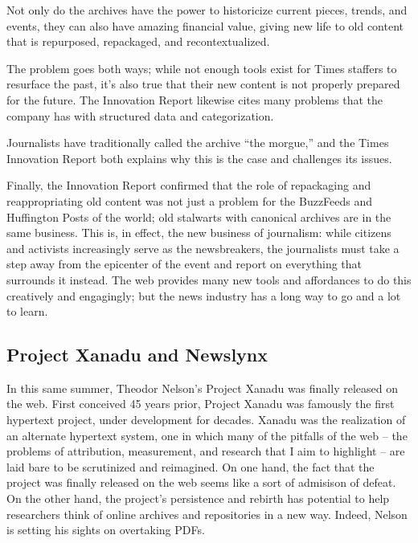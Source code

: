 Not only do the archives have the power to historicize current pieces, trends, and events, they can also have amazing financial value, giving new life to old content that is repurposed, repackaged, and recontextualized.

The problem goes both ways; while not enough tools exist for Times staffers to resurface the past, it's also true that their new content is not properly prepared for the future. The Innovation Report likewise cites many problems that the company has with structured data and categorization.

Journalists have traditionally called the archive ``the morgue,'' and the Times Innovation Report both explains why this is the case and challenges its issues.

Finally, the Innovation Report confirmed that the role of repackaging and reappropriating old content was not just a problem for the BuzzFeeds and Huffington Posts of the world; old stalwarts with canonical archives are in the same business. This is, in effect, the new business of journalism: while citizens and activists increasingly serve as the newsbreakers, the journalists must take a step away from the epicenter of the event and report on everything that surrounds it instead. The web provides many new tools and affordances to do this creatively and engagingly; but the news industry has a long way to go and a lot to learn.

\subsection{Project Xanadu and Newslynx}

In this same summer, Theodor Nelson's Project Xanadu was finally released on the web. First conceived 45 years prior, Project Xanadu was famously the first hypertext project, under development for decades. Xanadu was the realization of an alternate hypertext system, one in which many of the pitfalls of the web -- the problems of attribution, measurement, and research that I aim to highlight -- are laid bare to be scrutinized and reimagined. On one hand, the fact that the project was finally released on the web seems like a sort of admisison of defeat. On the other hand, the project's persistence and rebirth has potential to help researchers think of online archives and repositories in a new way. Indeed, Nelson is setting his sights on overtaking PDFs.

